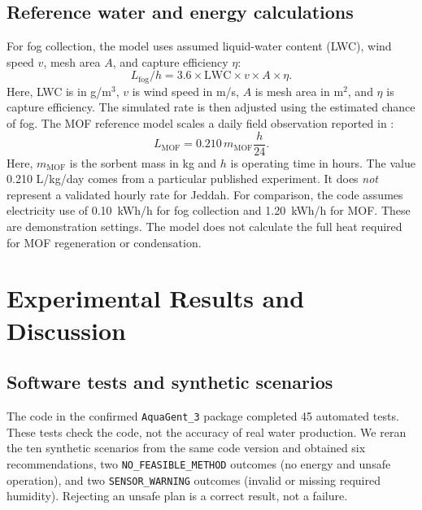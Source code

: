 \documentclass[11pt,a4paper]{article}
\begin{document}
\subsection{Reference water and energy calculations}
For fog collection, the model uses assumed liquid-water content (LWC), wind speed $v$, mesh area $A$, and capture efficiency $\eta$:
\begin{equation}
L_{\mathrm{fog}}/h = 3.6\times\mathrm{LWC}\times v\times A\times\eta.
\end{equation}
Here, LWC is in g/m$^3$, $v$ is wind speed in m/s, $A$ is mesh area in m$^2$, and $\eta$ is capture efficiency. The simulated rate is then adjusted using the estimated chance of fog. The MOF reference model scales a daily field observation reported in \citet{song2023}:
\begin{equation}
L_{\mathrm{MOF}}=0.210\,m_{\mathrm{MOF}}\frac{h}{24}.
\end{equation}
Here, $m_{\mathrm{MOF}}$ is the sorbent mass in kg and $h$ is operating time in hours. The value 0.210 L/kg/day comes from a particular published experiment. It does \emph{not} represent a validated hourly rate for Jeddah. For comparison, the code assumes electricity use of 0.10~kWh/h for fog collection and 1.20~kWh/h for MOF. These are demonstration settings. The model does not calculate the full heat required for MOF regeneration or condensation.

\newpage
\section{Experimental Results and Discussion}
\subsection{Software tests and synthetic scenarios}
The code in the confirmed \texttt{AquaGent\_3} package completed 45 automated tests. These tests check the code, not the accuracy of real water production. We reran the ten synthetic scenarios from the same code version and obtained six recommendations, two \texttt{NO\_FEASIBLE\_\allowbreak METHOD} outcomes (no energy and unsafe operation), and two \texttt{SENSOR\_\allowbreak WARNING} outcomes (invalid or missing required humidity). Rejecting an unsafe plan is a correct result, not a failure.
\end{document}
